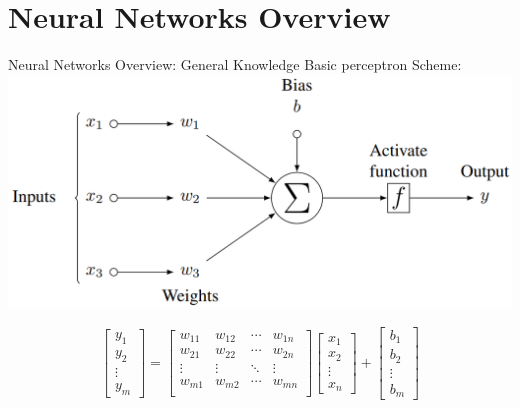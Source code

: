 \documentclass[10pt]{beamer}
\begin{document}

\begingroup
{}
\section{Neural Networks Overview}
\endgroup

\begin{frame}{Neural Networks Overview: General Knowledge}
  Basic perceptron Scheme:
  \includegraphics[width=0.9\linewidth]{./img/perceptron.png}


\begin{equation*}
  \begin{bmatrix}y_1\\ y_2 \\ \vdots \\ y_{m} \end{bmatrix} =
 \begin{bmatrix}
 w_{11} & w_{12} & \cdots & w_{1n}\\
 w_{21} & w_{22} & \cdots & w_{2n}\\
 \vdots & \vdots & \ddots & \vdots \\
  w_{m1} & w_{m2} & \cdots & w_{mn}\\
 \end{bmatrix}
 \begin{bmatrix}x_1 \\ x_2 \\ \vdots \\ x_n \end{bmatrix}
 + \begin{bmatrix}b_1 \\ b_2 \\ \vdots \\ b_m \end{bmatrix}
\end{equation*}

\end{frame}
\end{document}
